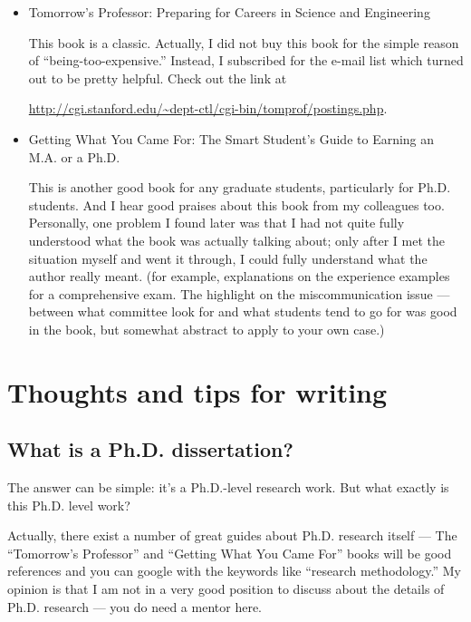 \documentclass[11pt]{article}
\begin{document}
\begin{itemize}
    \item Tomorrow's Professor: Preparing for Careers in Science and
        Engineering

        This book is a classic. Actually, I did not buy this book for the
        simple reason of ``being-too-expensive.'' Instead, I subscribed for
        the e-mail list which turned out to be pretty helpful.  Check out the
        link at
        \begin{small}\url{http://cgi.stanford.edu/\~dept-ctl/cgi-bin/tomprof/postings.php}.\end{small}

    \item Getting What You Came For: The Smart Student's Guide to Earning an
        M.A. or a Ph.D.

        This is another good book for any graduate students, particularly for
        Ph.D. students. And I hear good praises about this book from my
        colleagues too. Personally, one problem I found later was that I had
        not quite fully understood what the book was actually talking about;
        only after I met the situation myself and went it through, I could
        fully understand what the author really meant. (for example,
        explanations on the experience examples for a comprehensive exam. The
        highlight on the miscommunication issue --- between what committee
        look for and what students tend to go for was good in the book, but 
        somewhat abstract to apply to your own case.)


\end{itemize}


\section{Thoughts and tips for writing}

\subsection{What is a Ph.D. dissertation?}
The answer can be simple: it's a Ph.D.-level research work. But what exactly is
this Ph.D. level work? 

Actually, there exist a number of great guides about Ph.D. research itself --- 
The ``Tomorrow's Professor'' and ``Getting What You Came For'' books will be
good references and you can google with the keywords like ``research
methodology.'' My opinion is that I am not in a very good position to discuss
about the details of Ph.D. research --- you do need a mentor here.
\end{document}
